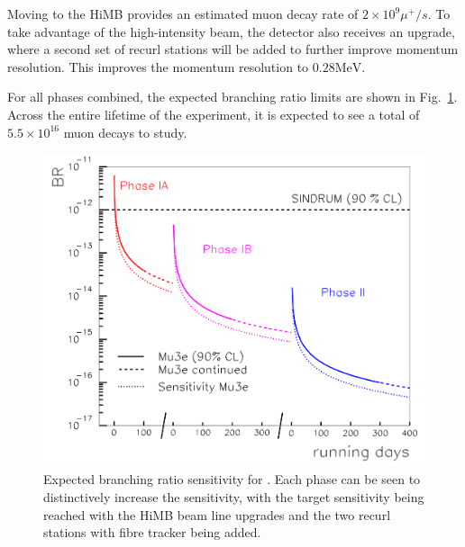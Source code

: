 \noindent Moving to the HiMB provides an estimated muon decay rate of $2 \times 10^9 \mu^+/s$.
To take advantage of the high-intensity beam, the detector also receives an upgrade, where a second set of recurl stations will be added to further improve momentum resolution.
This improves the momentum resolution to $0.28\textrm{MeV}$.

For all phases combined, the expected branching ratio limits are shown in Fig.\ \ref{fig:mu3e_br_limits}.
Across the entire lifetime of the experiment, it is expected to see a total of $5.5 \times 10^{16}$ muon decays to study.

\begin{figure}[h]
    \centering
    \includegraphics[width = \textwidth]{Figures/experiments/mu3e_br_limits.png}
    \caption{Expected branching ratio sensitivity for \mueee \cite{Blondel:2013ia}.
    Each phase can be seen to distinctively increase the sensitivity, with the target sensitivity being reached with the HiMB beam line upgrades and the two recurl stations with fibre tracker being added.}
    \label{fig:mu3e_br_limits}
\end{figure}
